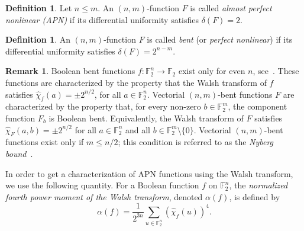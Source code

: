 \documentclass{amsart}[11pt]
\theoremstyle{plain}
\theoremstyle{definition}
\newtheorem{definition}[theorem]{Definition}
\newtheorem{remark}[theorem]{Remark}
\numberwithin{theorem}{section}
\numberwithin{equation}{section}
\numberwithin{table}{section}
\numberwithin{figure}{section}
\numberwithin{algorithm}{section}
\def\F{\mathbb F}
\begin{document}
\begin{definition}\label{def:apn}
	Let $n \le m$. An $(n,m)$-function $F$ is called \emph{almost perfect nonlinear (APN)} if its differential uniformity satisfies $\delta(F)=2$.
\end{definition}

\begin{definition}\label{def:bent}
	An $(n,m)$-function $F$ is called \emph{bent} (or \emph{perfect nonlinear}) if its differential uniformity satisfies $\delta(F)=2^{n-m}$.
\end{definition}

\begin{remark}
	Boolean bent functions $f\colon \F_2^n \to \F_2$ exist only for even $n$, see~\cite{ROTHAUS1976}. These functions are characterized by the property that the Walsh transform of $f$ satisfies
	$\hat{\chi}_f(a)=\pm 2^{n/2}$, for all $a\in\F_2^n$. Vectorial $(n,m)$-bent functions $F$ are characterized by the property that, for every non-zero $b\in\F_2^m$, the component function $F_b$ is Boolean bent. Equivalently, the Walsh transform of $F$ satisfies
	$\hat{\chi}_F(a,b)=\pm 2^{n/2}$ for all $a\in\F_2^n$ and all $b\in\F_2^m\setminus\{0\}$. Vectorial $(n,m)$-bent functions exist only if $m \le n/2$; this condition is referred to as the \emph{Nyberg bound}~\cite{Nyberg91}.
\end{remark}

In order to get a characterization of APN functions using the Walsh transform, we use the following quantity. For a Boolean function $f$ on $\F_2^n$, the \emph{normalized fourth power moment of the Walsh transform}, denoted $\alpha(f)$, is defined by
\begin{equation}\label{eq: alpha}
    \alpha(f) = \frac{1}{2^{3n}}\sum_{u \in \mathbb{F}_2^n} (\hat{\chi}_f(u))^4.
\end{equation}
\end{document}
